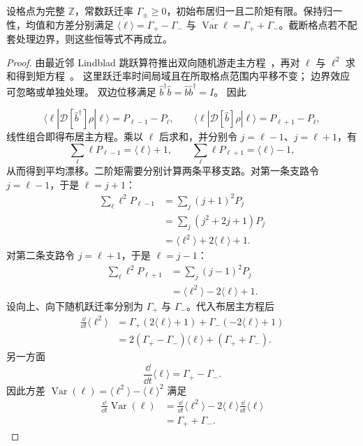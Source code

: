 \begin{proposition}[双向格点随机游走的漂移与扩散]
设格点为完整 $\mathbb Z$，常数跃迁率 $\Gamma_\pm\ge0$，初始布居归一且二阶矩有限。保持归一性，均值和方差分别满足 $\dot{\langle\ell\rangle}=\Gamma_+-\Gamma_-$ 与 $\dot{\operatorname{Var}\ell}=\Gamma_++\Gamma_-$。截断格点若不配套处理边界，则这些恒等式不再成立。
\end{proposition}
\begin{proof}
由最近邻 Lindblad 跳跃算符推出双向随机游走主方程~，再对 $\ell$ 与 $\ell^2$ 求和得到矩方程~。 这里跃迁率时间局域且在所取格点范围内平移不变； 边界效应可忽略或单独处理。 双边位移满足 $\hat b^\dagger\hat b=\hat b\hat b^\dagger=I$。 因此

\[
\langle\ell|\mathcal D[\hat b^\dagger]\rho|\ell\rangle
=P_{\ell-1}-P_\ell,
\qquad
\langle\ell|\mathcal D[\hat b]\rho|\ell\rangle
=P_{\ell+1}-P_\ell,
\]
线性组合即得布居主方程。乘以 $\ell$ 后求和，并分别令 $j=\ell-1$、$j=\ell+1$，有
\[
\sum_\ell\ell P_{\ell-1}=\langle\ell\rangle+1,
\qquad
\sum_\ell\ell P_{\ell+1}=\langle\ell\rangle-1,
\]
从而得到平均漂移。二阶矩需要分别计算两条平移支路。对第一条支路令 $j=\ell-1$，于是 $\ell=j+1$：
\begin{align*}
\sum_\ell\ell^2P_{\ell-1}
&=\sum_j(j+1)^2P_j\\
&=\sum_j(j^2+2j+1)P_j\\
&=\langle\ell^2\rangle+2\langle\ell\rangle+1.
\end{align*}
对第二条支路令 $j=\ell+1$，于是 $\ell=j-1$：
\begin{align*}
\sum_\ell\ell^2P_{\ell+1}
&=\sum_j(j-1)^2P_j\\
&=\langle\ell^2\rangle-2\langle\ell\rangle+1.
\end{align*}
设向上、向下随机跃迁率分别为 $\Gamma_+$ 与 $\Gamma_-$。代入布居主方程后
\begin{align*}
\frac{\dd}{\dd t}\langle\ell^2\rangle
&=\Gamma_+\left(2\langle\ell\rangle+1\right)
+\Gamma_-\left(-2\langle\ell\rangle+1\right)\\
&=2(\Gamma_+-\Gamma_-)\langle\ell\rangle
+(\Gamma_++\Gamma_-).
\end{align*}
另一方面
\[
\frac{\dd}{\dd t}\langle\ell\rangle
=\Gamma_+-\Gamma_-.
\]
因此方差 $\operatorname{Var}(\ell)=\langle\ell^2\rangle-\langle\ell\rangle^2$ 满足
\begin{align*}
\frac{\dd}{\dd t}\operatorname{Var}(\ell)
&=\frac{\dd}{\dd t}\langle\ell^2\rangle
-2\langle\ell\rangle
\frac{\dd}{\dd t}\langle\ell\rangle\\
&=\Gamma_++\Gamma_-.
\end{align*}
\end{proof}


